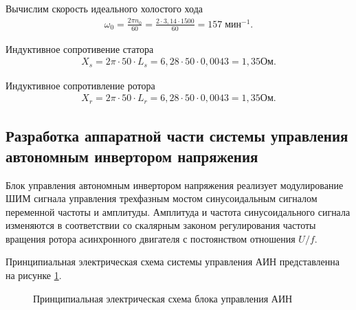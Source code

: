         Вычислим скорость идеального холостого хода
        \begin{gather*}
            \omega_0 = \frac{2\pi n_0}{60} 
                = \frac{2 \cdot 3,14 \cdot 1500}{60} = 157 \; \text{мин}^{-1}.
        \end{gather*}

        Индуктивное сопротивение статора
        \begin{gather*}
            X_s = 2\pi \cdot 50 \cdot L_s
                = 6,28 \cdot 50 \cdot 0,0043 = 1,35 \text{Ом}.
        \end{gather*}
        
        Индуктивное сопротивление ротора
        \begin{gather*}
            X_r = 2\pi \cdot 50 \cdot L_r
                = 6,28 \cdot 50 \cdot 0,0043 = 1,35 \text{Ом}.
        \end{gather*}
    \subsection{Разработка аппаратной части системы управления автономным
        инвертором напряжения}


        Блок управления автономным инвертором напряжения реализует
        модулирование ШИМ сигнала управления трехфазным мостом синусоидальным
        сигналом переменной частоты и амплитуды. Амплитуда и частота
        синусоидального сигнала изменяются в соответствии со скалярным законом
        регулирования частоты вращения ротора асинхронного двигателя с
        постоянством отношения $U/f$.

        Принципиальная электрическая схема системы управления АИН представленна
        на рисунке \ref{fig:control-schematic}.

        \begin{figure}
            \caption{Принципиальная электрическая схема блока управления АИН}
            \label{fig:control-schematic}
        \end{figure}

